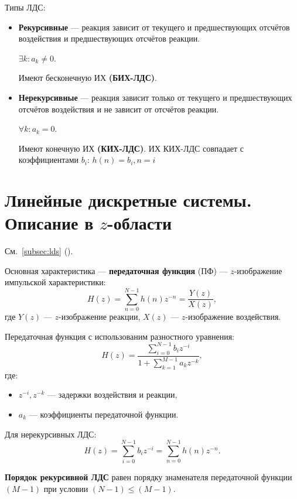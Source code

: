 \documentclass[a4paper, 14pt]{extarticle}
\begin{document}
Типы ЛДС:
\begin{itemize}
    \item \textbf{Рекурсивные} --- реакция зависит от текущего и предшествующих отсчётов воздействия и предшествующих отсчётов реакции.
        
        $ \exists k: a_k \ne 0$.

        Имеют бесконечную ИХ \textbf{(БИХ-ЛДС)}.
    \item \textbf{Нерекурсивные} --- реакция зависит только от текущего и предшествующих отсчётов воздействия и не зависит от отсчётов реакции.

        $\forall k: a_k = 0$.

        Имеют конечную ИХ \textbf{(КИХ-ЛДС)}. ИХ КИХ-ЛДС совпадает с коэффициентами $b_i$: $h(n) = b_i, n=i$
\end{itemize}

\section{Линейные дискретные системы. Описание в $z$-области}
См.~\ref{subsec:lds} ().

Основная характеристика --- \textbf{передаточная функция} (ПФ) --- $z$-изображение импульской характеристики:
\begin{equation}
    H(z) = \sum^{N-1}_{n=0} h(n) z^{-n} = \frac{Y(z)}{X(z)},
\end{equation}
где $Y(z)$ --- $z$-изображение реакции, $X(z)$ --- $z$-изображение воздействия.

Передаточная функция с использованим разностного уравнения:
\begin{equation}
    H(z) = \frac{ \sum^{N-1}_{i=0} b_i z^{-i} }{1 + \sum^{M-1}_{k=1} a_k z^{-k}},
\end{equation}
где:
\begin{itemize}
    \item $z^{-i}, z^{-k}$ --- задержки воздействия и реакции,
    \item $a_k$ --- коэффициенты передаточной функции.
\end{itemize}

Для нерекурсивных ЛДС:
\begin{equation}
    H(z) = \sum^{N-1}_{i=0} b_i z^{-i} = \sum^{N-1}_{n=0} h(n) z^{-n}.
\end{equation}

\textbf{Порядок рекурсивной ЛДС} равен порядку знаменателя передаточной функции $(M-1)$ при условии $(N-1) \le (M-1)$.
\end{document}
